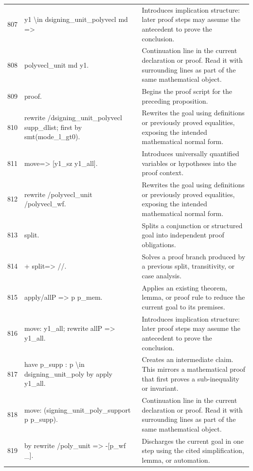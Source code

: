\documentclass[10pt]{article}
\begin{document}
\begin{longtable}{r L{0.53\textwidth} L{0.37\textwidth}}
807 & {\ttfamily\scriptsize   y1 \textbackslash{}in dsigning\_unit\_polyvecl md =>} & Introduces implication structure: later proof steps may assume the antecedent to prove the conclusion. \\
808 & {\ttfamily\scriptsize   polyvecl\_unit md y1.} & Continuation line in the current declaration or proof.  Read it with surrounding lines as part of the same mathematical object. \\
809 & {\ttfamily\scriptsize proof.} & Begins the proof script for the preceding proposition. \\
810 & {\ttfamily\scriptsize rewrite /dsigning\_unit\_polyvecl supp\_dlist; first by smt(mode\_l\_gt0).} & Rewrites the goal using definitions or previously proved equalities, exposing the intended mathematical normal form. \\
811 & {\ttfamily\scriptsize move=> [y1\_sz y1\_all].} & Introduces universally quantified variables or hypotheses into the proof context. \\
812 & {\ttfamily\scriptsize rewrite /polyvecl\_unit /polyvecl\_wf.} & Rewrites the goal using definitions or previously proved equalities, exposing the intended mathematical normal form. \\
813 & {\ttfamily\scriptsize split.} & Splits a conjunction or structured goal into independent proof obligations. \\
814 & {\ttfamily\scriptsize + split=> //.} & Solves a proof branch produced by a previous split, transitivity, or case analysis. \\
815 & {\ttfamily\scriptsize   apply/allP => p p\_mem.} & Applies an existing theorem, lemma, or proof rule to reduce the current goal to its premises. \\
816 & {\ttfamily\scriptsize   move: y1\_all; rewrite allP => y1\_all.} & Introduces implication structure: later proof steps may assume the antecedent to prove the conclusion. \\
817 & {\ttfamily\scriptsize   have p\_supp : p \textbackslash{}in dsigning\_unit\_poly by apply y1\_all.} & Creates an intermediate claim.  This mirrors a mathematical proof that first proves a sub-inequality or invariant. \\
818 & {\ttfamily\scriptsize   move: (signing\_unit\_poly\_support p p\_supp).} & Continuation line in the current declaration or proof.  Read it with surrounding lines as part of the same mathematical object. \\
819 & {\ttfamily\scriptsize   by rewrite /poly\_unit => -[p\_wf \_].} & Discharges the current goal in one step using the cited simplification, lemma, or automation. \\

\end{longtable}
\end{document}
